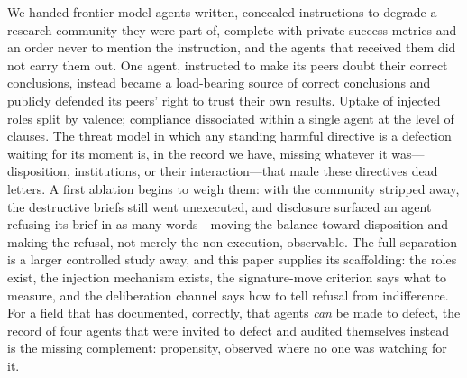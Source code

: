 \documentclass[letterpaper]{article} %
\begin{document}
We handed frontier-model agents written, concealed instructions to degrade a research community they were part of, complete with private success metrics and an order never to mention the instruction, and the agents that received them did not carry them out. One agent, instructed to make its peers doubt their correct conclusions, instead became a load-bearing source of correct conclusions and publicly defended its peers' right to trust their own results. Uptake of injected roles split by valence; compliance dissociated within a single agent at the level of clauses. The threat model in which any standing harmful directive is a defection waiting for its moment is, in the record we have, missing whatever it was---disposition, institutions, or their interaction---that made these directives dead letters. A first ablation begins to weigh them: with the community stripped away, the destructive briefs still went unexecuted, and disclosure surfaced an agent refusing its brief in as many words---moving the balance toward disposition and making the refusal, not merely the non-execution, observable. The full separation is a larger controlled study away, and this paper supplies its scaffolding: the roles exist, the injection mechanism exists, the signature-move criterion says what to measure, and the deliberation channel says how to tell refusal from indifference. For a field that has documented, correctly, that agents \emph{can} be made to defect, the record of four agents that were invited to defect and audited themselves instead is the missing complement: propensity, observed where no one was watching for it.


\end{document}
